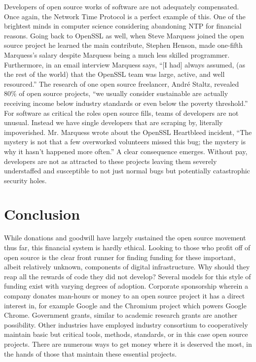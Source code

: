 \documentclass[format=sigconf]{acmart}
\begin{document}
Developers of open source works of software are not adequately compensated. Once again, the Network Time Protocol is a perfect example of this. One of the brightest minds in computer science considering abandoning NTP for financial reasons. Going back to OpenSSL as well, when Steve Marquess joined the open source project he learned the main contribute, Stephen Henson, made one-fifth Marquess's salary despite Marquess being a much less skilled programmer. \cite{ford} Furthermore, in an email interview Marquess says, ``[I had] always assumed, (as the rest of the world) that the OpenSSL team was large, active, and well resourced.'' \cite{ford} The research of one open source freelancer, André Staltz, revealed 80\% of open source projects, ``we usually consider sustainable are actually receiving income below industry standards or even below the poverty threshold.'' \cite{staltz} For software as critical the roles open source fills, teams of developers are not unusual. Instead we have single developers that are scraping by, literally impoverished. Mr. Marquess wrote about the OpenSSL Heartbleed incident, ``The mystery is not that a few overworked volunteers missed this bug; the mystery is why it hasn't happened more often.'' \cite{ford} A clear consequence emerges. Without pay, developers are not as attracted to these projects leaving them severely understaffed and susceptible to not just normal bugs but potentially catastrophic security holes.

\section{Conclusion}

While donations and goodwill have largely sustained the open source movement thus far, this financial system is hardly ethical. Looking to those who profit off of open source is the clear front runner for finding funding for these important, albeit relatively unknown, components of digital infrastructure. Why should they reap all the rewards of code they did not develop? Several models for this style of funding exist with varying degrees of adoption. Corporate sponsorship wherein a company donates man-hours or money to an open source project it has a direct interest in, for example Google and the Chromium project which powers Google Chrome. Government grants, similar to academic research grants are another possibility. Other industries have employed industry consortium to cooperatively maintain basic but critical tools, methods, standards, or in this case open source projects. There are numerous ways to get money where it is deserved the most, in the hands of those that maintain these essential projects.

\medskip



\end{document}
